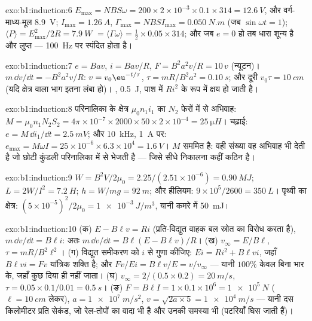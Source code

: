 \begin{solution}{exo:b1:induction:6}
$E_{\max} = NBS\omega = 200 \times 2 \times 10^{-3} \times 0.1 \times 314 = \qty{12.6}{V}$, और
वर्ग-माध्य-मूल \qty{8.9}{V}; $I_{\max} = \qty{1.26}{A}$, $\Gamma_{\max} = NBSI_{\max} = \qty{0.050}{N.m}$
(जब $\sin\omega t = 1$); $\langle P\rangle = E_{\max}^2/2R = \qty{7.9}{W}$ $=
\langle\Gamma\omega\rangle = \tfrac12 \times 0.05 \times 314$; और जब $e = 0$ हो तब धारा
शून्य है और  लुप्त ---  \qty{100}{Hz} पर स्पंदित होता है।
\end{solution}

\begin{solution}{exo:b1:induction:7}
$e = Bav$, $i = Bav/R$, $F = B^2a^2v/R = 10\,v$ (न्यूटन)। $m\,\dd v/\dd t = -B^2a^2v/R$:
$v = v_0\eu^{-t/\tau}$, $\tau = mR/B^2a^2 = \qty{0.10}{s}$; और दूरी $v_0\tau =
\qty{10}{cm}$ (यदि क्षेत्र वाला भाग इतना लंबा हो)। ,
\qty{0.5}{J}, पाश में $Ri^2$ के रूप में क्षय हो जाती है।
\end{solution}

\begin{solution}{exo:b1:induction:8}
परिनालिका के क्षेत्र $\mu_0n_1i_1$ का $N_2$ फेरों में से अभिवाह: $M =
\mu_0n_1N_2S_2 = 4\pi \times 10^{-7} \times 2000 \times 50 \times 2 \times 10^{-4} = \qty{25}{\micro H}$।
चढ़ाई: $e = M\,\dd i_1/\dd t = \qty{2.5}{mV}$; और \qty{10}{kHz}, \qty{1}{A} पर: $e_{\max} =
M\omega I = 25 \times 10^{-6} \times 6.3 \times 10^4 = \qty{1.6}{V}$। $M$ सममित है:
वही संख्या वह अभिवाह भी देती है जो छोटी कुंडली परिनालिका में से भेजती है
--- जिसे सीधे निकालना कहीं कठिन है।
\end{solution}

\begin{solution}{exo:b1:induction:9}
$W = B^2V/2\mu_0 = 2.25/(2.51 \times 10^{-6}) = \qty{0.90}{MJ}$; $L = 2W/I^2 =
\qty{7.2}{H}$; $h = W/mg = \qty{92}{m}$; और हीलियम: $9 \times 10^5/2600 = \qty{350}{L}$।
पृथ्वी का क्षेत्र: $(5 \times 10^{-5})^2/2\mu_0 = \qty{1e-3}{J/m^3}$, यानी कमरे
में \qty{50}{mJ}।
\end{solution}

\begin{solution}{exo:b1:induction:10}
(क) $E - B\ell v = Ri$ (प्रति-विद्युत वाहक बल स्रोत का विरोध करता है), $m\,\dd v/\dd t =
B\ell i$: अतः $m\,\dd v/\dd t = B\ell(E - B\ell v)/R$। (ख) $v_\infty = E/B\ell$, $\tau =
mR/B^2\ell^2$। (ग) विद्युत समीकरण को $i$ से गुणा कीजिए: $Ei = Ri^2 +
B\ell vi$, जहाँ $B\ell vi = Fv$ यांत्रिक शक्ति है; और  $Fv/Ei =
B\ell v/E = v/v_\infty$ --- यानी $100\%$ केवल बिना भार के, जहाँ कुछ दिया ही
नहीं जाता। (घ) $v_\infty = 2/(0.5 \times 0.2) = \qty{20}{m/s}$, $\tau = 0.05 \times
0.1/0.01 = \qty{0.5}{s}$। (ङ) $F = B\ell I = 1 \times 0.1 \times 10^6 = \qty{1e5}{N}$
($\ell = \qty{10}{cm}$ लेकर), $a = \qty{1e7}{m/s^2}$, $v = \sqrt{2a \times 5} =
\qty{1e4}{m/s}$ --- यानी दस किलोमीटर प्रति सेकंड, जो रेल-तोपों का वादा भी है
और उनकी समस्या भी (पटरियाँ घिस जाती हैं)।
\end{solution}

